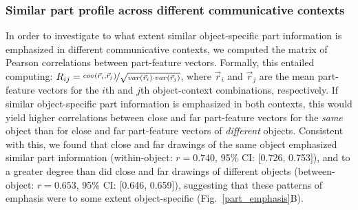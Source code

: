 \documentclass[10pt,letterpaper]{article}
\begin{document}
\subsubsection{Similar part profile across different communicative contexts}

In order to investigate to what extent similar object-specific part information is emphasized in different communicative contexts, we computed the matrix of Pearson correlations between part-feature vectors. 
Formally, this entailed computing: $R_{ij} =  \nicefrac{cov(\vec{r}_{i}, \vec{r}_{j})}{\sqrt{var(\vec{r}_{i}) \cdot var(\vec{r}_{j})}}$, where $\vec{r}_{i}$ and $\vec{r}_{j}$ are the mean part-feature vectors for the $i$th and $j$th object-context combinations, respectively.
If similar object-specific part information is emphasized in both contexts, this would yield higher correlations between close and far part-feature vectors for the \textit{same} object than for close and far part-feature vectors of \textit{different} objects. 
Consistent with this, we found that close and far drawings of the same object emphasized similar part information (within-object: $r = 0.740$, 95\% CI: [0.726, 0.753]), and to a greater degree than did close and far drawings of different objects (between-object: $r = 0.653$, 95\% CI: [0.646, 0.659]), suggesting that these patterns of emphasis were to some extent object-specific (Fig.~\ref{part_emphasis}B). 

\end{document}
